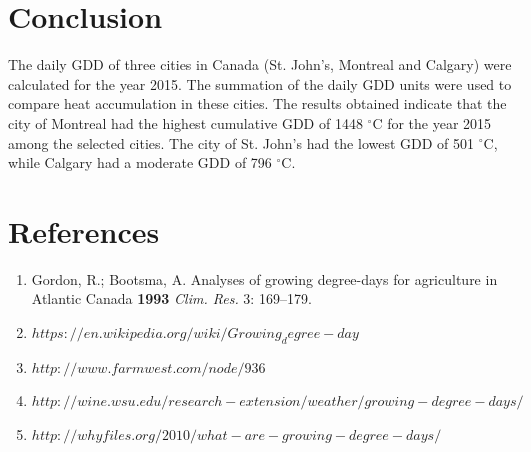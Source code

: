 \documentclass{article}
\begin{document}
\section{Conclusion}
The daily GDD of three cities in Canada (St. John's, Montreal and Calgary) were calculated for the year 2015. The summation of the daily GDD units were used to compare heat accumulation in these cities. The results obtained indicate that the city of Montreal had the highest cumulative GDD of 1448 $^{\circ}$C for the year 2015 among the selected cities. The city of St. John's had the lowest GDD of 501 $^{\circ}$C, while Calgary had a moderate GDD of 796 $^{\circ}$C.

\section{References}
%
\begin{enumerate}
\item Gordon, R.; Bootsma, A. Analyses of growing degree-days for agriculture in Atlantic Canada \textbf{1993} \textit{Clim. Res.} 3: 169--179.
\item \href{url}{$https://en.wikipedia.org/wiki/Growing_degree-day$}
\item \href{url}{$http://www.farmwest.com/node/936$}
\item \href{url}{$http://wine.wsu.edu/research-extension/weather/growing-degree-days/$}
\item \href{url}{$http://whyfiles.org/2010/what-are-growing-degree-days/$}
\end{enumerate}

%
\end{document}
